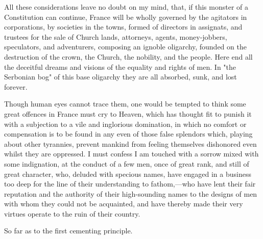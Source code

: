 All these considerations leave no doubt on my mind, that, if this monster of a Constitution can continue, France will be wholly governed by the agitators in corporations, by societies in the towns, formed of directors in assignats, and trustees for the sale of Church lands, attorneys, agents, money-jobbers, speculators, and adventurers, composing an ignoble oligarchy, founded on the destruction of the crown, the Church, the nobility, and the people. Here end all the deceitful dreams and visions of the equality and rights of men. In "the Serbonian bog" of this base oligarchy they are all absorbed, sunk, and lost forever.

Though human eyes cannot trace them, one would be tempted to think some great offences in France must cry to Heaven, which has thought fit to punish it with a subjection to a vile and inglorious domination, in which no comfort or compensation is to be found in any even of those false splendors which, playing about other tyrannies, prevent mankind from feeling themselves dishonored even whilst they are oppressed. I must confess I am touched with a sorrow mixed with some indignation, at the conduct of a few men, once of great rank, and still of great character, who, deluded with specious names, have engaged in a business too deep for the line of their understanding to fathom,—who have lent their fair reputation and the authority of their high-sounding names to the designs of men with whom they could not be acquainted, and have thereby made their very virtues operate to the ruin of their country.

So far as to the first cementing principle.

